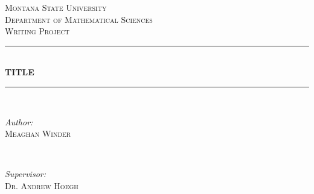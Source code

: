 \documentclass[12pt]{article}\usepackage[]{graphicx}\usepackage[]{color}
\begin{document}
\begin{titlepage}

\newcommand{\HRule}{\rule{\linewidth}{0.5mm}} %

\center %
 

\textsc{\LARGE Montana State University}\\[0.5cm] %
\textsc{\Large Department of Mathematical Sciences}\\[0.5cm] %
\textsc{\large Writing Project}\\[.75cm] %


\HRule \\[0.4cm]
{ \huge \bfseries TITLE }\\[0.4cm] %
\HRule \\[1.5cm]
 

\begin{minipage}{0.4\textwidth}
\begin{flushleft} 
\large
\emph{Author:} \\
\textsc{Meaghan Winder} \\
\end{flushleft}
\end{minipage}
~
\begin{minipage}{0.4\textwidth}
\begin{flushright} 
\large
\emph{Supervisor:} \\
\textsc{Dr. Andrew Hoegh} 
\end{flushright}
\end{minipage}\\[1.5cm]



\end{titlepage}
\end{document}
